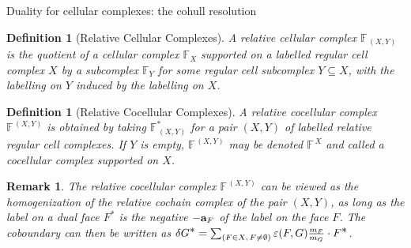 \documentclass[12pt,leqno]{article}
\newtheorem{defn}[thm]{Definition}
\newtheorem{remark}[thm]{Remark}
\def\Ast{{\textstyle \ast}}
\def\aa{{{\rm \bf a}}}
\def\FF{{\mathbb F}}
\begin{document}
\begin{section}{Duality for cellular complexes: the cohull resolution}
\begin{defn}[Relative Cellular Complexes]
A \emph{relative cellular complex} $\FF_{\,(X,Y)}$ is the quotient
of a cellular complex $\FF_X$ supported on a labelled regular cell
complex $X$ by a subcomplex $\FF_Y$ for some regular cell
subcomplex $Y \subseteq X$, with the labelling on $Y$ induced by the
labelling on $X$.
\end{defn}

\begin{defn}[Relative Cocellular Complexes] \label{defn:relcocell}
A \emph{relative cocellular complex} $\FF^{\,(X,Y)}$ is obtained by
taking $\FF_{\,(X,Y)}^\Ast$ for a pair $(X,Y)$ of labelled relative
regular cell complexes.  If $Y$ is empty, $\FF^{\,(X,Y)}$ may be denoted
$\FF^{\,X}\!$ and called a \emph{cocellular complex} supported on $X$.
\end{defn}

\begin{remark} \rm
The relative cocellular complex $\FF^{\,(X,Y)}$ can be viewed as the
homogenization of the relative cochain complex of the pair $(X,Y)$, as
long as the label on a dual face $F^\Ast$ is the negative $-\aa_F$ of the
label on the face $F$.  The coboundary can then be written as $\delta
G^\Ast = \sum_{(F \in X,\,F \neq \emptyset)} \varepsilon(F,G){ m_F \over
m_G} \cdot F^\Ast$.
\end{remark}


\end{section}
\end{document}
